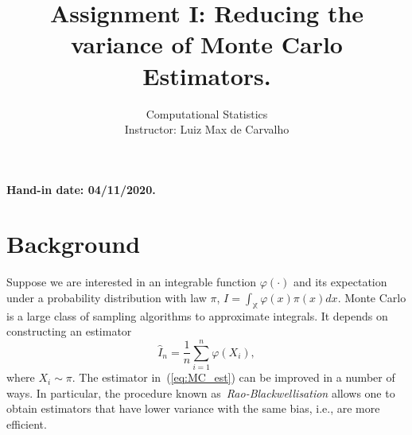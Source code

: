 \documentclass[a4paper,10pt, notitlepage]{report}
\title{Assignment I: Reducing the variance of Monte Carlo Estimators.}
\author{Computational Statistics \\ Instructor: Luiz Max de Carvalho}
\begin{document}
\maketitle

\textbf{Hand-in date: 04/11/2020.}


\section*{Background}

Suppose we are interested in an integrable function $\varphi(\cdot)$ and its expectation under a probability distribution with law $\pi$, $I = \int_{\mathbb{X}} \varphi(x) \pi(x) dx$.
Monte Carlo is a large class of sampling algorithms to approximate integrals.
It depends on constructing an estimator
\begin{equation}
\label{eq:MC_est}
 \hat{I}_n = \frac{1}{n} \sum_{i=1}^n \varphi(X_i),
\end{equation}
where $X_i \sim \pi$.
The estimator in~(\ref{eq:MC_est}) can be improved in a number of ways.
In particular, the procedure known as~\textit{Rao-Blackwellisation} allows one to obtain estimators that have lower variance with the same bias, i.e., are more efficient.
\end{document}
